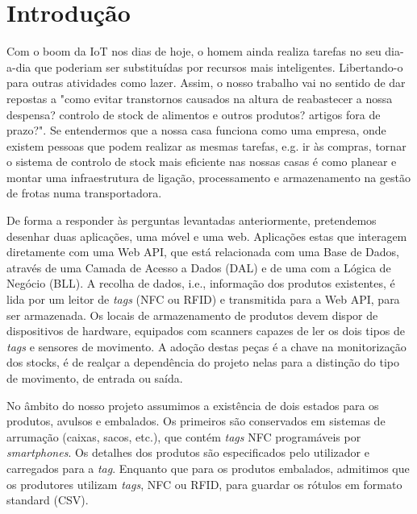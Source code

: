 %
%
\chapter*{Introdução} \label{Introducao}

Com o boom da IoT nos dias de hoje, o homem ainda realiza tarefas no seu dia-a-dia que poderiam ser substituídas por recursos mais inteligentes. Libertando-o para outras atividades como lazer. Assim, o nosso trabalho vai no sentido de dar repostas a "como evitar transtornos causados na altura de reabastecer a nossa despensa? controlo de stock de alimentos e outros produtos? artigos fora de prazo?". Se entendermos que a nossa casa funciona como uma empresa, onde existem pessoas que podem realizar as mesmas tarefas, e.g. ir às compras, tornar o sistema de controlo de stock mais eficiente nas nossas casas é como planear e montar uma infraestrutura de ligação, processamento e armazenamento na gestão de frotas numa transportadora.

De forma a responder às perguntas levantadas anteriormente, pretendemos desenhar duas aplicações, uma móvel e uma web. Aplicações estas que interagem diretamente com uma Web API, que está relacionada com uma Base de Dados, através de uma Camada de Acesso a Dados (DAL) e de uma com a Lógica de Negócio (BLL). A recolha de dados, i.e., informação dos produtos existentes, é lida por um leitor de {\itshape tags} (NFC ou RFID) e transmitida para a Web API, para ser armazenada. Os locais de armazenamento de produtos devem dispor de dispositivos de hardware, equipados com scanners capazes de ler os dois tipos de {\itshape tags} e sensores de movimento. A adoção destas peças é a chave na monitorização dos stocks, é de realçar a dependência do projeto nelas para a distinção do tipo de movimento, de entrada ou saída.

No âmbito do nosso projeto assumimos a existência de dois estados para os produtos, avulsos e embalados. Os primeiros são conservados em sistemas de arrumação (caixas, sacos, etc.), que contém {\itshape tags} NFC programáveis por {\itshape smartphones}. Os detalhes dos produtos são especificados pelo utilizador e carregados para a {\itshape tag}. Enquanto que para os produtos embalados, admitimos que os produtores utilizam {\itshape tags}, NFC ou RFID, para guardar os rótulos em formato standard (CSV).